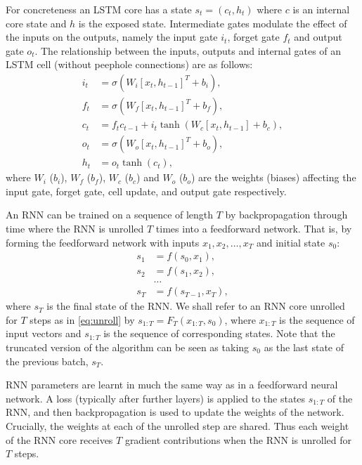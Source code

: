 For concreteness an LSTM core \cite{hochreiter1997long} has a state $s_t = (c_t, h_t)$ where $c$ is an internal core state and $h$ is the exposed state.
Intermediate gates modulate the effect of the inputs on the outputs, namely the input gate $i_t$, forget gate $f_t$ and output gate $o_t$.
The relationship between the inputs, outputs and internal gates of an LSTM cell (without peephole connections) are as follows:
\begin{align*}
i_t &= \sigma(W_i [x_t, h_{t-1}]^T + b_i), \\
f_t &= \sigma(W_f [x_t, h_{t-1}]^T + b_f), \\
c_t &= f_t c_{t-1} + i_t \tanh(W_c [x_t, h_{t-1}] + b_c), \\
o_t &= \sigma(W_o [x_t, h_{t-1}]^T + b_o), \\
h_t &= o_t \tanh(c_t),
\end{align*}
where $W_i$ ($b_i$), $W_f$ ($b_f$), $W_c$ ($b_c$) and $W_o$ ($b_o$) are the weights (biases) affecting the input gate, forget gate, cell update, and output gate respectively.

An RNN can be trained on a sequence of length $T$ by backpropagation through time where the RNN is unrolled $T$ times into a feedforward network.
That is, by forming the feedforward network with inputs
$x_1, x_2, \dots, x_T$ and initial state $s_0$:
\begin{align}
s_1 &= f(s_0, x_1), \nonumber \\
s_2 &= f(s_1, x_2), \nonumber \\
&\dots \nonumber \\
\label{eq:unroll}
s_T &= f(s_{T-1}, x_T), 
\end{align}
where $s_T$ is the final state of the RNN.
We shall refer to an RNN core unrolled for $T$ steps as in \eqref{eq:unroll} by $s_{1:T} = F_T(x_{1:T}, s_0)$,
where $x_{1:T}$ is the sequence of input vectors and $s_{1:T}$ is the sequence of corresponding states. Note that the truncated version of the algorithm can be seen as taking $s_0$ as the last state of the previous batch, $s_T$.

RNN parameters are learnt in much the same way as in a feedforward neural network.
A loss (typically after further layers) is applied to the states $s_{1:T}$ of the RNN, and then backpropagation is used to update the weights of the network.
Crucially, the weights at each of the unrolled step are shared. 
Thus each weight of the RNN core receives $T$ gradient contributions when the RNN is unrolled for $T$ steps.

